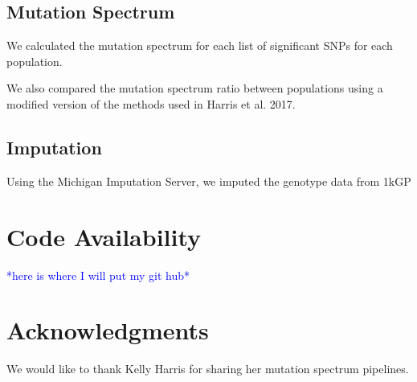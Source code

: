 \documentclass[9pt,lineno]{elife}
\newcommand{\todo}[1]{\textcolor{blue}{*#1*}}
\begin{document}
\subsection{Mutation Spectrum}
We calculated the mutation spectrum for each list of significant SNPs for each population.  

We also compared the mutation spectrum ratio between populations using a modified version of the methods used in Harris et al. 2017. 

\subsection{Imputation}
Using the Michigan Imputation Server, we imputed the genotype data from 1kGP


\section{Code Availability}
\todo{here is where I will put my git hub}

\section{Acknowledgments}
We would like to thank Kelly Harris for sharing her mutation spectrum pipelines.
 

\end{document}
